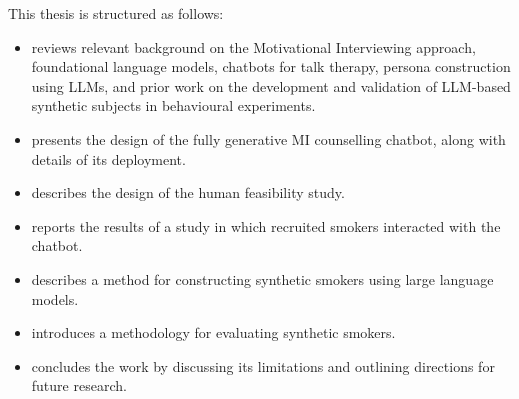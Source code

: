 This thesis is structured as follows:
\begin{itemize}
	\item {} reviews relevant background on the Motivational Interviewing approach, foundational language models, chatbots for talk therapy, persona construction using LLMs, and prior work on the development and validation of LLM-based synthetic subjects in behavioural experiments.
	\item {} presents the design of the fully generative MI counselling chatbot, along with details of its deployment.
	\item {} describes the design of the human feasibility study.
	\item {} reports the results of a study in which recruited smokers interacted with the chatbot.
	\item {} describes a method for constructing synthetic smokers using large language models.
	\item {} introduces a methodology for evaluating synthetic smokers.
	\item {} concludes the work by discussing its limitations and outlining directions for future research.
\end{itemize}
